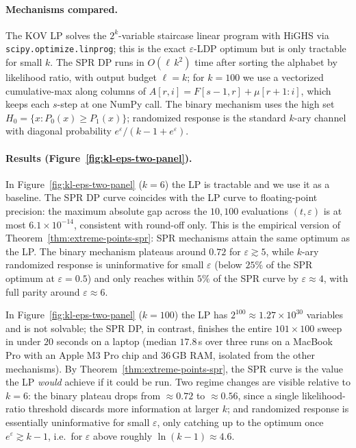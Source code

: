 \documentclass{article}
\theoremstyle{plain}
\theoremstyle{definition}
\theoremstyle{plain}
\newcommand{\eps}{\varepsilon}
\begin{document}
\paragraph{Mechanisms compared.}
The KOV LP solves the $2^k$-variable staircase linear program with HiGHS via \texttt{scipy.optimize.linprog}; this is the exact $\eps$-LDP optimum but is only tractable for small $k$. The SPR DP runs in $O(\ell\,k^2)$ time after sorting the alphabet by likelihood ratio, with output budget $\ell=k$; for $k=100$ we use a vectorized cumulative-max along columns of $A[r,i]=F[s-1,r]+\mu[r+1:i]$, which keeps each $s$-step at one NumPy call. The binary mechanism uses the high set $H_0=\{x:P_0(x)\ge P_1(x)\}$; randomized response is the standard $k$-ary channel with diagonal probability $e^\eps/(k-1+e^\eps)$.

\paragraph{Results (Figure~\ref{fig:kl-eps-two-panel}).}
In Figure~\ref{fig:kl-eps-two-panel} ($k=6$) the LP is tractable and we use it as a baseline. The SPR DP curve coincides with the LP curve to floating-point precision: the maximum absolute gap across the $10{,}100$ evaluations $(t,\eps)$ is at most $6.1\times 10^{-14}$, consistent with round-off only. This is the empirical version of Theorem~\ref{thm:extreme-points-spr}: SPR mechanisms attain the same optimum as the LP. The binary mechanism plateaus around $0.72$ for $\eps\gtrsim 5$, while $k$-ary randomized response is uninformative for small $\eps$ (below $25\%$ of the SPR optimum at $\eps=0.5$) and only reaches within $5\%$ of the SPR curve by $\eps\approx 4$, with full parity around $\eps\approx 6$.

In Figure~\ref{fig:kl-eps-two-panel} ($k=100$) the LP has $2^{100}\approx 1.27\times 10^{30}$ variables and is not solvable; the SPR DP, in contrast, finishes the entire $101\times 100$ sweep in under $20$ seconds on a laptop (median $17.8$\,s over three runs on a MacBook Pro with an Apple M3 Pro chip and $36$\,GB RAM, isolated from the other mechanisms). By Theorem~\ref{thm:extreme-points-spr}, the SPR curve is the value the LP \emph{would} achieve if it could be run. Two regime changes are visible relative to $k=6$: the binary plateau drops from $\approx 0.72$ to $\approx 0.56$, since a single likelihood-ratio threshold discards more information at larger $k$; and randomized response is essentially uninformative for small $\eps$, only catching up to the optimum once $e^\eps\gtrsim k-1$, i.e.\ for $\eps$ above roughly $\ln(k-1)\approx 4.6$.
\end{document}
